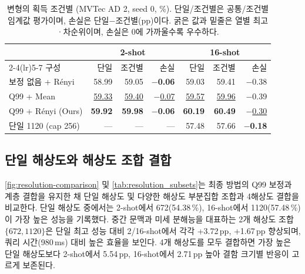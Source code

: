 \begin{table}[!htbp]
\centering\scriptsize\setlength{\tabcolsep}{3pt}
\caption{\method{} 변형의 획득 조건별 \AUPRO{} (MVTec AD 2, seed 0, \%). 단일/조건별은 공통/조건별 임계값 평가이며, 손실은 단일$-$조건별(pp)이다. 굵은 값과 밑줄은 열별 최고·차순위이며, 손실은 0에 가까울수록 우수하다.}
\label{tab:condition_variants}
\begin{tabular*}{\columnwidth}{@{\extracolsep{\fill}}lrrrrrr}
\toprule
& \multicolumn{3}{c}{2-shot} & \multicolumn{3}{c}{16-shot} \\
\cmidrule(lr){2-4}\cmidrule(lr){5-7}
구성 & 단일 & 조건별 & 손실 & 단일 & 조건별 & 손실 \\
\midrule
보정 없음 + Rényi & 58.99 & 59.05 & \textbf{$-$0.06} & 59.03 & 59.41 & $-$0.38 \\
Q99 + Mean & \underline{59.33} & \underline{59.40} & \underline{$-$0.07} & \underline{59.57} & \underline{59.96} & $-$0.39 \\
Q99 + Rényi (Ours) & \textbf{59.92} & \textbf{59.98} & \textbf{$-$0.06} & \textbf{60.19} & \textbf{60.49} & \underline{$-$0.30} \\
\midrule
단일 1120 (cap 256) & --- & --- & --- & 57.48 & 57.66 & \textbf{$-$0.18} \\
\bottomrule
\end{tabular*}
\end{table}

\FloatBarrier
\subsection{단일 해상도와 해상도 조합 결합}
\label{sec:appendix:resolution}
\cref{fig:resolution-comparison} 및 \cref{tab:resolution_subsets}는 최종 방법의 Q99 보정과 계층 결합을 유지한 채 단일 해상도 및 다양한 해상도 부분집합 조합과 4해상도 결합을 비교한다.
단일 해상도 중에서는 2-shot에서 672(54.38\,\%), 16-shot에서 1120(57.48\,\%)이 가장 높은 성능을 기록했다.
중간 문맥과 미세 분해능을 대표하는 2개 해상도 조합 $\{672, 1120\}$은 단일 최고 성능 대비 2/16-shot에서 각각 +3.72\,pp, +1.67\,pp 향상되며, 쿼리 시간(980\,ms) 대비 높은 효율을 보인다.
4개 해상도를 모두 결합하면 가장 높은 단일 해상도보다 2-shot에서 5.54\,pp, 16-shot에서 2.71\,pp 높아 결함 크기별 반응이 고르게 보존된다.

